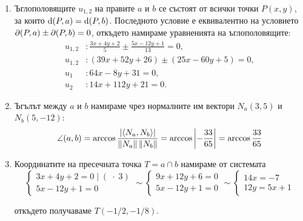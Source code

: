 \documentclass[numbers=endperiod]{scrartcl}
\begin{document}
\begin{solution}
\begin{enumerate}[label=\alph*)]
        \item Ъглополовящите $u_{1,2}$ на правите $a$ и $b$ се състоят от всички точки $P(x, y)$, за които $\operatorname{d}(P, a) = \operatorname{d}(P, b)$. Последното условие е еквивалентно на условието $\partial(P, a) \pm \partial(P, b) = 0$, откъдето намираме уравненията на ъглополовящите:
        \begin{align*}
            u_{1,2}&: \frac {3x + 4y + 2} 5 \pm \frac {5x - 12y + 1} {13} = 0, \\
            u_{1,2}&: (39x + 52y + 26) \pm (25x - 60y + 5) = 0, \\
            u_1&: 64x - 8y + 31 = 0, \\
            u_2&: 14x + 112y + 21 = 0.
        \end{align*}

        \item Ъгълът между $a$ и $b$ намираме чрез нормалните им вектори $N_a(3, 5)$ и $N_b(5, -12)$:
        \begin{displaymath}
            \angle(a, b) = \arccos \frac {\left\vert \left\langle N_a, N_b \right\rangle \right\vert} {\left\Vert N_a \right\Vert \left\Vert N_b \right\Vert} = \arccos \left\vert - \frac {33} {65} \right\vert = \arccos \frac {33} {65}
        \end{displaymath}

        \item Координатите на пресечната точка $T = a \cap b$ намираме от системата
        \begin{displaymath}
            \begin{cases}
                3x + 4y + 2 = 0 \;|\; (\;\cdot\; 3) \\
                5x - 12y + 1 = 0
            \end{cases}
            \sim
            \begin{cases}
                9x + 12y + 6 = 0 \\
                5x - 12y + 1 = 0
            \end{cases}
            \sim
            \begin{cases}
                14x = -7 \\
                12y = 5x + 1
            \end{cases}
        \end{displaymath}

        откъдето получаваме $T(-1/2, -1/8)$.


\end{enumerate}
\end{solution}
\end{document}
